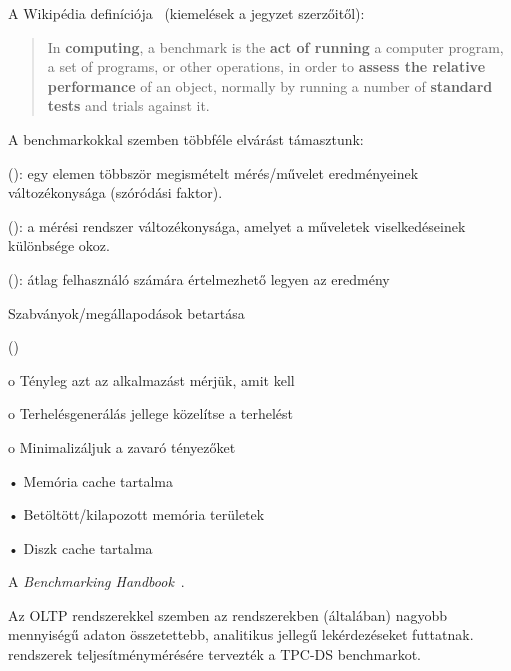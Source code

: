 A Wikipédia definíciója~\cite{wiki:benchmark} (kiemelések a jegyzet szerzőitől):

\begin{quote}
	In \textbf{computing}, a benchmark is the \textbf{act of running} a computer program, a set of programs, or other operations, in order to \textbf{assess the relative performance} of an object, normally by running a number of \textbf{standard tests} and trials against it.
\end{quote}

A benchmarkokkal szemben többféle elvárást támasztunk:

\begin{definicio}
	 (): egy elemen többször megismételt mérés/művelet eredményeinek változékonysága (szóródási faktor).
\end{definicio}

\begin{definicio}
	 (): a mérési rendszer változékonysága, amelyet a műveletek viselkedéseinek különbsége okoz.
\end{definicio}

\begin{definicio}
	 (): átlag felhasználó számára értelmezhető legyen az eredmény
\end{definicio}

Szabványok/megállapodások betartása

 ()

o Tényleg azt az alkalmazást mérjük, amit kell

o Terhelésgenerálás jellege közelítse a  terhelést

o Minimalizáljuk a zavaró tényezőket

• Memória cache tartalma

• Betöltött/kilapozott memória területek

• Diszk cache tartalma

A \emph{Benchmarking Handbook}~\cite{DBLP:books/mk/Gray93}.




\begin{megjegyzes}
Az OLTP rendszerekkel szemben az  rendszerekben (általában) nagyobb mennyiségű adaton összetettebb, analitikus jellegű lekérdezéseket futtatnak.  rendszerek teljesítménymérésére tervezték a \mbox{TPC-DS} benchmarkot.
\end{megjegyzes}

